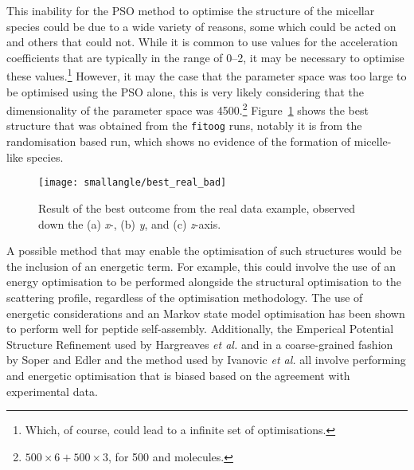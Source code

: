 This inability for the PSO method to optimise the structure of the micellar species could be due to a wide variety of reasons, some which could be acted on and others that could not.
While it is common to use values for the acceleration coefficients that are typically in the range of \numrange{0}{2}, it may be necessary to optimise these values.\footnote{Which, of course, could lead to a infinite set of optimisations.}
However, it may the case that the parameter space was too large to be optimised using the PSO alone, this is very likely considering that the dimensionality of the parameter space was 4500.\footnote{$500\times6+500\times3$, for 500  and  molecules.}
Figure~\ref{fig:best_real_bad} shows the best structure that was obtained from the \texttt{fitoog} runs, notably it is from the randomisation based run, which shows no evidence of the formation of micelle-like species.
%
\begin{figure}
    \centering
    \texttt{[image: smallangle/best\_real\_bad]}
    \caption{Result of the best outcome from the real data example, observed down the (a) \emph{x}-, (b) \emph{y}, and (c) \emph{z}-axis.}
    \label{fig:best_real_bad}
\end{figure}
%

A possible method that may enable the optimisation of such structures would be the inclusion of an energetic term.
For example, this could involve the use of an energy optimisation to be performed alongside the structural optimisation to the scattering profile, regardless of the optimisation methodology.
The use of energetic considerations and an Markov state model optimisation has been shown to perform well for peptide self-assembly.\autocite{sengupta_automated_2019}
Additionally, the Emperical Potential Structure Refinement used by Hargreaves \emph{et al.}\autocite{hargreaves_atomistic_2011} and in a coarse-grained fashion by Soper and Edler\autocite{soper_coarse-grained_2017} and the method used by Ivanovic \emph{et al.}\autocite{ivanovic_temperature-dependent_2018} all involve performing and energetic optimisation that is biased based on the agreement with experimental data.
